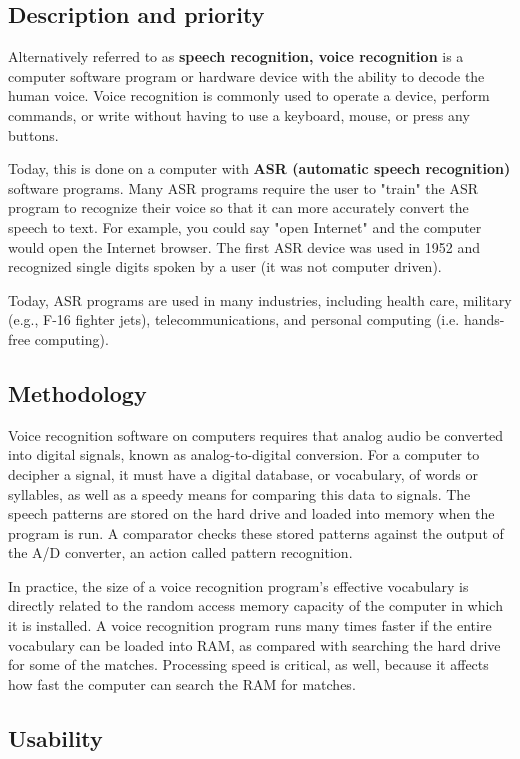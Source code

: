 \documentclass{scrreprt}
\begin{document}
\subsection{Description and priority}
Alternatively referred to as \textbf{speech recognition, voice recognition} is a computer software program or hardware device with the ability to decode the human voice. Voice recognition is commonly used to operate a device, perform commands, or write without having to use a keyboard, mouse, or press any buttons.

Today, this is done on a computer with \textbf{ASR (automatic speech recognition)} software programs. Many ASR programs require the user to "train" the ASR program to recognize their voice so that it can more accurately convert the speech to text. For example, you could say "open Internet" and the computer would open the Internet browser.
The first ASR device was used in 1952 and recognized single digits spoken by a user (it was not computer driven).

Today, ASR programs are used in many industries, including health care, military (e.g., F-16 fighter jets), telecommunications, and personal computing (i.e. hands-free computing).

\subsection{Methodology}

Voice recognition software on computers requires that analog audio be converted into digital signals, known as analog-to-digital conversion. For a computer to decipher a signal, it must have a digital database, or vocabulary, of words or syllables, as well as a speedy means for comparing this data to signals. The speech patterns are stored on the hard drive and loaded into memory when the program is run. A comparator checks these stored patterns against the output of the A/D converter, an action called pattern recognition.

In practice, the size of a voice recognition program's effective vocabulary is directly related to the random access memory capacity of the computer in which it is installed. A voice recognition program runs many times faster if the entire vocabulary can be loaded into RAM, as compared with searching the hard drive for some of the matches. Processing speed is critical, as well, because it affects how fast the computer can search the RAM for matches.

\subsection{Usability}
\end{document}
